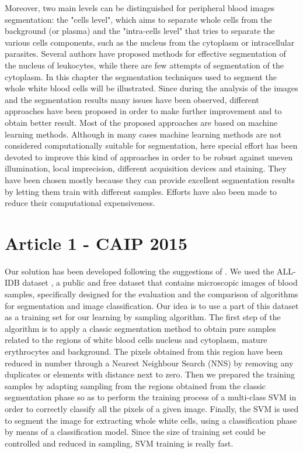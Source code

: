 \documentclass[final,a4paper,12pt,english]{UnicaPhdThesis3}
\begin{document}
	Moreover, two main levels can be distinguished for peripheral blood images segmentation: the "cells level", which aims to separate whole cells from the background (or plasma) and the "intra-cells level" that tries to separate the various cells components, such as the nucleus from the cytoplasm or intracellular parasites. Several authors have proposed methods for effective segmentation of the nucleus of leukocytes, while there are few attempts of segmentation of the cytoplasm. In this chapter the segmentation techniques used to segment the whole white blood cells will be illustrated. Since during the analysis of the images and the segmentation results many issues have been observed, different approaches have been proposed in order to make further improvement and to obtain better result. Most of the proposed approaches are based on machine learning methods. Although in many cases machine learning methods are not considered computationally suitable for segmentation, here special effort has been devoted to improve this kind of approaches in order to be robust against uneven illumination, local imprecision, different acquisition devices and staining. They have been chosen mostly because they can provide excellent segmentation results by letting them train with different samples. Efforts have also been made to reduce their computational expensiveness.
	
	\section{Article 1 - CAIP 2015}
	Our solution has been developed following the suggestions of \cite{fukunaga,shapiro,Gonzalez}. We used the ALL-IDB  dataset \cite{Donida Labati}, a public and free dataset that contains microscopic images of blood samples, specifically designed for the evaluation and the comparison of algorithms for segmentation and image classification. Our idea is to use a part of this dataset as a training set for our learning by sampling algorithm. The first step of the algorithm is to apply a classic segmentation method to obtain pure samples related to the regions of white blood cells nucleus and cytoplasm, mature erythrocytes and background. The pixels obtained from this region have been reduced in number through a Nearest Neighbour  Search (NNS) by removing any duplicates or elements with distance next to zero. Then we prepared the training samples by adapting sampling from the regions obtained from the classic segmentation phase so as to perform the training process of a multi-class SVM in order to correctly classify all the pixels of a given image. Finally, the SVM is used to segment the image for extracting whole white cells, using a classification phase by means of a classification model. Since the size of training set could be controlled and reduced in sampling, SVM training is really fast. 
	
\end{document}
